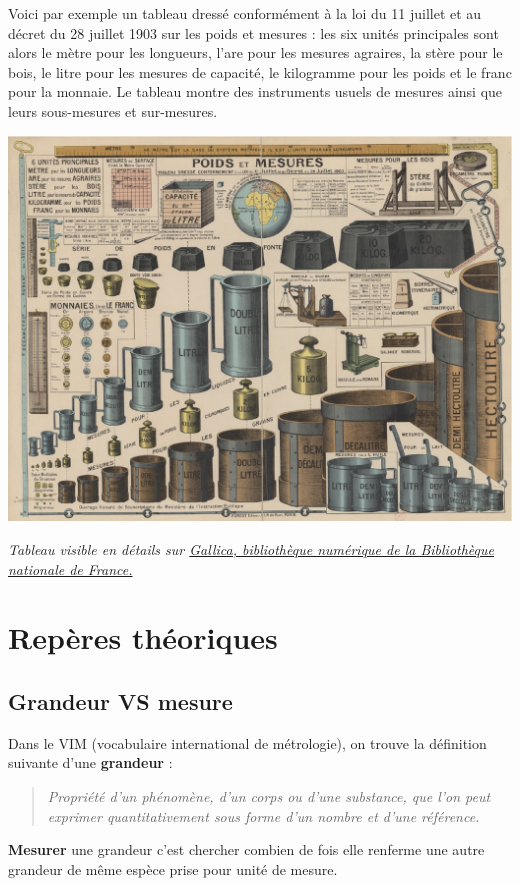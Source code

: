 Voici par exemple un tableau dressé conformément à la loi du 11 juillet et au décret du 28 juillet 1903 sur les poids et mesures : les six unités principales sont alors le mètre pour les longueurs, l'are pour les mesures agraires, la stère pour le bois, le litre pour les mesures de capacité, le kilogramme pour les poids et le franc pour la monnaie. Le tableau montre des instruments usuels de mesures ainsi que leurs sous-mesures et sur-mesures.
\begin{center}
   \includegraphics[width=16.5cm]{Grandeurs_mesures/Images/M13_M14_cours_intro_poids_et_mesures}
\end{center}    
{\it Tableau visible en détails sur \href{https://gallica.bnf.fr/ark:/12148/btv1b53066549q#}{Gallica, bibliothèque numérique de la Bibliothèque nationale de France.}}



\section{Repères théoriques} %
\label{deux}

\subsection{Grandeur VS mesure} %

Dans le VIM (vocabulaire international de métrologie), on trouve la définition suivante d'une {\bf grandeur} :
\begin{quote}
   {\it Propriété d'un phénomène, d'un corps ou d'une substance, que l'on peut exprimer quantitativement sous forme d'un nombre et d'une référence.}
\end{quote}
{\bf Mesurer} une grandeur c'est chercher combien de fois elle renferme une autre grandeur de même espèce prise pour unité de mesure. \smallskip
   
